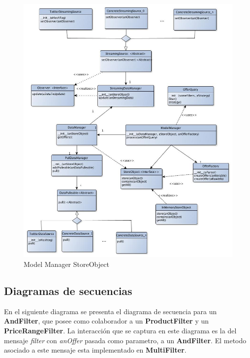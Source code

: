 \documentclass[10pt, a4paper]{article}
\begin{document}
\begin{figure}[H]
\centering
\includegraphics[scale=0.6]{graphics/model_manager_storeObject_class.jpg}
\caption{Model Manager StoreObject}
\end{figure}

\newpage
\subsection{Diagramas de secuencias}

En el siguiente diagrama se presenta el diagrama de secuencia para un \textbf{AndFilter}, que posee como colaborador a un \textbf{ProductFilter} y un \textbf{PriceRangeFilter}. La interacción que se captura en este diagrama es la del mensaje \emph{filter} con \emph{anOffer} pasada como parametro, a un \textbf{AndFilter}.
El metodo asociado a este mensaje esta implementado en \textbf{MultiFilter}. 
\end{document}
